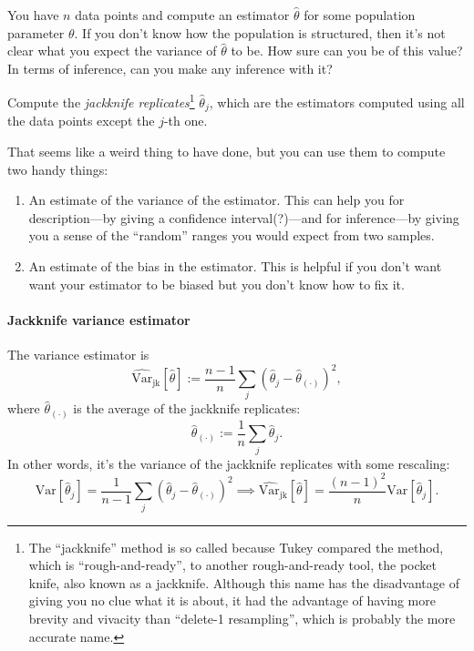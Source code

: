\documentclass{book}
\providecommand{\tightlist}{%
  \setlength{\itemsep}{0pt}\setlength{\parskip}{0pt}}
\begin{document}
You have \(n\) data points and compute an estimator \(\hat{\theta}\) for
some population parameter \(\theta\). If you don't know how the
population is structured, then it's not clear what you expect the
variance of \(\hat{\theta}\) to be. How sure can you be of this value?
In terms of inference, can you make any inference with it?

Compute the \emph{jackknife replicates}\footnote{The ``jackknife''
  method is so called because Tukey compared the method, which is
  ``rough-and-ready'', to another rough-and-ready tool, the pocket
  knife, also known as a jackknife. Although this name has the
  disadvantage of giving you no clue what it is about, it had the
  advantage of having more brevity and vivacity than ``delete-1
  resampling'', which is probably the more accurate name.}
\(\hat{\theta}_j\), which are the estimators computed using all the data
points except the \(j\)-th one.

That seems like a weird thing to have done, but you can use them to
compute two handy things:

\begin{enumerate}
\def\labelenumi{\arabic{enumi}.}
\tightlist
\item
  An estimate of the variance of the estimator. This can help you for
  description---by giving a confidence interval(?)---and for
  inference---by giving you a sense of the ``random'' ranges you would
  expect from two samples.
\item
  An estimate of the bias in the estimator. This is helpful if you don't
  want want your estimator to be biased but you don't know how to fix
  it.
\end{enumerate}

\paragraph{Jackknife variance
estimator}\label{jackknife-variance-estimator}

The variance estimator is \[
\widehat{\mathrm{Var}}_\mathrm{jk}[\hat{\theta}] := \frac{n-1}{n}  \sum_j \left( \hat{\theta}_j - \hat{\theta}_{(\cdot)} \right)^2,
\] where \(\hat{\theta}_{(\cdot)}\) is the average of the jackknife
replicates: \[
\hat{\theta}_{(\cdot)} := \frac{1}{n} \sum_j \hat{\theta}_j.
\] In other words, it's the variance of the jackknife replicates with
some rescaling: \[
\mathrm{Var}[\hat{\theta}_j] = \frac{1}{n-1} \sum_j \left( \hat{\theta}_j - \hat{\theta}_{(\cdot)} \right)^2 \implies
  \widehat{\mathrm{Var}}_\mathrm{jk}[\hat{\theta}] = \frac{(n-1)^2}{n} \mathrm{Var}[\hat{\theta}_j].
\]
\end{document}
